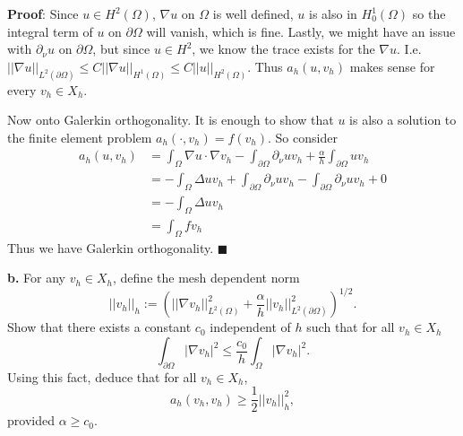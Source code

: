 \documentclass[11pt]{article}
\begin{document}
\vskip 1cm

\textbf{Proof}: Since $u\in H^2(\Omega)$, $\nabla u$ on $\Omega$ is well defined, $u$ is also in $H^1_0(\Omega)$ so the integral term of $u$ on $\partial \Omega$ will vanish, which is fine. 
Lastly, we might have an issue with $\partial_\nu u$ on $\partial\Omega$, but since $u \in H^2$, we know the trace exists for the $\nabla u$.
I.e. $||\nabla u||_{L^2(\partial\Omega)} \leq C ||\nabla u||_{H^1(\Omega)} \leq C ||u||_{H^2(\Omega)}$.
Thus $a_h(u,v_h)$ makes sense for every $v_h \in X_h$. 

Now onto Galerkin orthogonality. It is enough to show that $u$ is also a solution to the finite element problem $a_h(\cdot, v_h) = f(v_h)$. So consider 
\begin{align*}
a_h(u, v_h) &= \int_\Omega \nabla u \cdot \nabla v_h - \int_{\partial\Omega} \partial_\nu u v_h + \frac{\alpha}{h}\int_{\partial\Omega} uv_h \\
&= -\int_\Omega \Delta u v_h + \int_{\partial\Omega} \partial_\nu u v_h - \int_{\partial\Omega} \partial_\nu u v_h + 0 \\
&= -\int_\Omega \Delta u v_h \\
&= \int_\Omega f v_h
\end{align*}
Thus we have Galerkin orthogonality. $\blacksquare$


\vskip 2cm



\textbf{b.} For any $v_h \in X_h$, define the mesh dependent norm
\begin{equation}
    ||v_h||_h := \left( ||\nabla v_h||^2_{L^2(\Omega)} + \frac{\alpha}{h}||v_h||^2_{L^2(\partial\Omega)} \right)^{1/2}.
\end{equation}
Show that there exists a constant $c_0$ independent of $h$ such that for all $v_h \in X_h$
\begin{equation}
    \int_{\partial\Omega} |\nabla v_h|^2 \leq \frac{c_0}{h} \int_\Omega |\nabla v_h|^2.
\end{equation}
Using this fact, deduce that for all $v_h \in X_h$,
\begin{equation}
    a_h(v_h, v_h) \geq \frac{1}{2}||v_h||^2_h,
\end{equation}
provided $\alpha \geq c_0$.


\vskip 1cm
\end{document}
